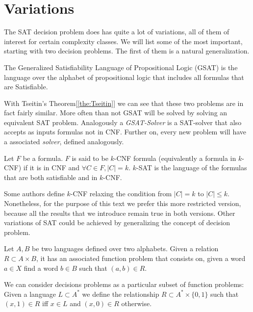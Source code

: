 \section{Variations}

The SAT decision problem does has quite a lot of variations, all of them of interest for certain complexity classes. We will list some of the most important, starting with two decision problems. The first of them is a natural generalization.

\begin{definition}
  The Generalized Satisfiability Language of Propositional Logic (GSAT) is the language over the alphabet of propositional logic that includes all formulas that are Satisfiable.
\end{definition}

With Tseitin's Theorem[\ref{the:Tseitin}] we can see that these two problems are in fact fairly similar. More often than not GSAT will be solved by solving an equivalent SAT problem. Analogously a \emph{GSAT-Solver}  is a SAT-solver that also accepts as inputs formulas not in CNF. Further on, every new problem will have a associated \emph{solver}, defined analogously.



\begin{definition}
  Let $F$ be a formula. $F$ is said to be $k$-CNF formula (equivalently a formula in $k$-CNF) if it is in CNF and $\forall C \in F, |C| = k$. $k$-SAT is the language of the formulas that are both satisfiable and in $k$-CNF.
\end{definition}


Some authors define $k$-CNF relaxing the condition from $|C| = k$ to $|C| \le k$. Nonetheless, for the purpose of this text we prefer this more restricted version, because all the results that we introduce remain true in both versions.  Other variations of SAT could be achieved by generalizing the concept of decision problem.

\begin{definition}
  Let $A,B$ be two languages defined over two alphabets. Given a relation $R\subset A\times B$, it has an associated function problem that consists on, given a word $a\in X$ find a word $b\in B$ such that $(a,b)\in R$.
\end{definition}

We can consider decisions problems as a particular subset of function problems: Given a language $L\subset A^*$ we define the relationship $R\subset A^*\times \{0,1\}$ such that $(x,1)\in R$ iff $x\in L$ and $(x,0)\in R$ otherwise.

